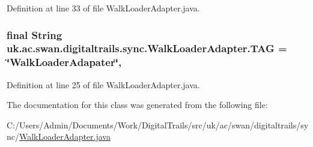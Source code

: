 Definition at line 33 of file Walk\+Loader\+Adapter.\+java.

\hypertarget{classuk_1_1ac_1_1swan_1_1digitaltrails_1_1sync_1_1_walk_loader_adapter_a2fd52aa3ac92edbca2c86250cb670a5f}{
\subsubsection[{T\+A\+G}]{\setlength{\rightskip}{0pt plus 5cm}final String uk.\+ac.\+swan.\+digitaltrails.\+sync.\+Walk\+Loader\+Adapter.\+T\+A\+G = \char`\"{}Walk\+Loader\+Adapater\char`\"{}\hspace{0.3cm}{\ttfamily [static]}, {\ttfamily [private]}}}\label{classuk_1_1ac_1_1swan_1_1digitaltrails_1_1sync_1_1_walk_loader_adapter_a2fd52aa3ac92edbca2c86250cb670a5f}


Definition at line 25 of file Walk\+Loader\+Adapter.\+java.



The documentation for this class was generated from the following file\+:\begin{DoxyCompactItemize}
\item 
C\+:/\+Users/\+Admin/\+Documents/\+Work/\+Digital\+Trails/src/uk/ac/swan/digitaltrails/sync/\hyperlink{_walk_loader_adapter_8java}{Walk\+Loader\+Adapter.\+java}\end{DoxyCompactItemize}
